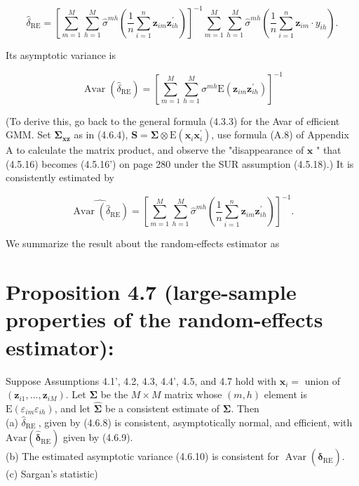 \documentclass[10pt]{article}
\begin{document}
\begin{equation*}
\hat{\delta}_{\mathrm{RE}}=\left[\sum_{m=1}^{M} \sum_{h=1}^{M} \hat{\sigma}^{m h}\left(\frac{1}{n} \sum_{i=1}^{n} \mathbf{z}_{i m} \mathbf{z}_{i h}^{\prime}\right)\right]^{-1} \sum_{m=1}^{M} \sum_{h=1}^{M} \hat{\sigma}^{m h}\left(\frac{1}{n} \sum_{i=1}^{n} \mathbf{z}_{i m} \cdot y_{i h}\right) . \tag{4.6.8}
\end{equation*}


Its asymptotic variance is


\begin{equation*}
\operatorname{Avar}\left(\hat{\delta}_{\mathrm{RE}}\right)=\left[\sum_{m=1}^{M} \sum_{h=1}^{M} \sigma^{m h} \mathrm{E}\left(\mathbf{z}_{i m} \mathbf{z}_{i h}^{\prime}\right)\right]^{-1} \tag{4.6.9}
\end{equation*}


(To derive this, go back to the general formula (4.3.3) for the Avar of efficient GMM. Set $\boldsymbol{\Sigma}_{\mathbf{x z}}$ as in (4.6.4), $\mathbf{S}=\boldsymbol{\Sigma} \otimes \mathrm{E}\left(\mathbf{x}_{i} \mathbf{x}_{i}^{\prime}\right)$, use formula (A.8) of Appendix A to calculate the matrix product, and observe the "disappearance of $\mathbf{x}$ " that (4.5.16) becomes (4.5.16') on page 280 under the SUR assumption (4.5.18).) It is consistently estimated by


\begin{equation*}
\widehat{\operatorname{Avar}\left(\hat{\delta}_{\mathrm{RE}}\right)}=\left[\sum_{m=1}^{M} \sum_{h=1}^{M} \hat{\sigma}^{m h}\left(\frac{1}{n} \sum_{i=1}^{n} \mathbf{z}_{i m} \mathbf{z}_{i h}^{\prime}\right)\right]^{-1} . \tag{4.6.10}
\end{equation*}


We summarize the result about the random-effects estimator as

\section*{Proposition 4.7 (large-sample properties of the random-effects estimator):}
Suppose Assumptions 4.1', 4.2, 4.3, 4.4', 4.5, and 4.7 hold with $\mathbf{x}_{i}=$ union of $\left(\mathbf{z}_{i 1}, \ldots, \mathbf{z}_{i M}\right)$. Let $\mathbf{\Sigma}$ be the $M \times M$ matrix whose $(m, h)$ element is $\mathrm{E}\left(\varepsilon_{i m} \varepsilon_{i h}\right)$, and let $\widehat{\mathbf{\Sigma}}$ be a consistent estimate of $\mathbf{\Sigma}$. Then\\
(a) $\hat{\delta}_{\text {RE }}$, given by (4.6.8) is consistent, asymptotically normal, and efficient, with $\mathrm{Avar}\left(\hat{\boldsymbol{\delta}}_{\mathrm{RE}}\right)$ given by (4.6.9).\\
(b) The estimated asymptotic variance (4.6.10) is consistent for $\operatorname{Avar}\left(\hat{\boldsymbol{\delta}}_{\mathrm{RE}}\right)$.\\
(c) Sargan's statistic)
\end{document}
